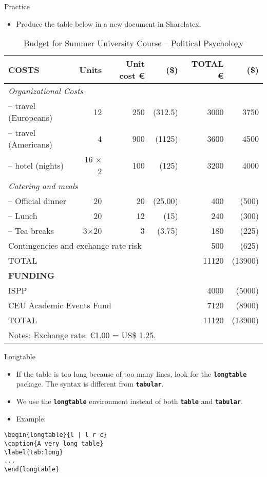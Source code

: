 \documentclass{beamer}
\newcommand{\bftt}[1]{\textbf{\texttt{#1}}}
\newcommand{\cmd}[1]{{\color[HTML]{008000}\bftt{#1}}}
\begin{document}
\begin{frame}{Practice}
	\begin{itemize}
		\item Produce the table below in a new document in Sharelatex.
	\end{itemize}
	\begin{table}[!ht]
		\scriptsize
		\caption{Budget for Summer University Course -- Political Psychology}
			\begin{tabular}{l r r r r r} \toprule
				\textbf{COSTS} & \textbf{Units} & \textbf{Unit cost \euro} & \multicolumn{1}{r}{\textbf{(\$)}} & \textbf{TOTAL \euro} & \multicolumn{1}{r}{\textbf{(\$)}} \\ \midrule
				\multicolumn{6}{l}{\textit{Organizational Costs}}  \\
				-- travel (Europeans) & 12 & 250 & (312.5) & 3000 & 3750 \\
				-- travel (Americans) & 4 & 900 & (1125) & 3600 & 4500 \\
				-- hotel (nights) & 16 $\times$ 2 & 100 & (125) & 3200 & 4000 \\
				\multicolumn{6}{l}{\textit{Catering and meals}} \\
				-- Official dinner & 20 & 20 & (25.00) & 400 & (500) \\
				-- Lunch & 20 & 12 & (15) & 240 & (300) \\
				-- Tea breaks & 3$\times$20 & 3 & (3.75) & 180 & (225) \\ \midrule
				\multicolumn{4}{l}{Contingencies and exchange rate risk} & 500 & (625) \\ \midrule
				TOTAL & & & & 11120 & (13900) \\ \midrule
				\textbf{FUNDING} & & & & & \\
				ISPP & & & & 4000 & (5000) \\
				\multicolumn{4}{l}{CEU Academic Events Fund} & 7120 & (8900) \\ 
				TOTAL & & & & 11120 & (13900) \\ \bottomrule
				\multicolumn{6}{l}{\tiny{Notes: Exchange rate: \euro 1.00 = US\$ 1.25.}}
			\end{tabular}
		\end{table}
\end{frame}

\begin{frame}[fragile]{Longtable}
\begin{itemize}  
\item If the table is too long because of too many lines, look for the \cmd{longtable} package. The syntax is different from \cmd{tabular}.
\item We use the \cmd{longtable} environment instead of both \cmd{table} and \cmd{tabular}.
\item Example:
\end{itemize}
\begin{verbatim}
\begin{longtable}{l | l r c}
\caption{A very long table}
\label{tab:long}
...
\end{longtable} 
\end{verbatim}
\end{frame}
\end{document}
